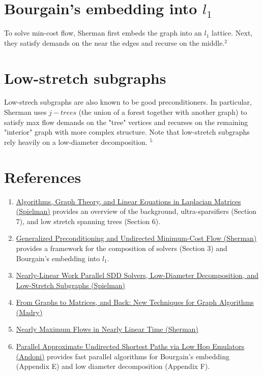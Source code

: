 \documentclass[11pt]{article}
\begin{document}
\section{Bourgain's embedding into $l_1$} To solve min-cost flow, Sherman first embeds the graph into an $l_1$ lattice. Next, they satisfy demands on the near the edges and recurse on the middle.$^2$

\section{Low-stretch subgraphs} Low-strech subgraphs are also known to be good preconditioners. In particular, Sherman uses $j-trees$ (the union of a forest together with another graph) to satisfy max flow demands on the "tree" vertices and recurses on the remaining "interior" graph with more complex structure. Note that low-stretch subgraphs rely heavily on a low-diameter decomposition. $^5$

\section{References}
\begin{enumerate}
        \item{} \href{http://www.cs.yale.edu/homes/spielman/PAPERS/icm10post.pdf}{Algorithms, Graph Theory, and Linear Equations in Laplacian Matrices (Spielman)} provides an overview of the background, ultra-sparsifiers (Section 7), and low stretch spanning trees (Section 6).

        \item{} \href{https://epubs.siam.org/doi/pdf/10.1137/1.9781611974782.49}{Generalized Preconditioning and Undirected Minimum-Cost Flow (Sherman)} provides a framework for the composition of solvers (Section 3) and Bourgain's embedding into $l_1$.

        \item{} \href{https://www.cs.cmu.edu/~guyb/papers/BGKMPT14.pdf}{Nearly-Linear Work Parallel SDD Solvers, Low-Diameter Decomposition, and Low-Stretch Subgraphs (Spielman)}

        \item{} \href{https://people.csail.mit.edu/madry/docs/thesis.pdf}{From Graphs to Matrices, and Back: New Techniques for Graph Algorithms (Madry)}

        \item{} \href{https://arxiv.org/pdf/1304.2077.pdf}{Nearly Maximum Flows in Nearly Linear Time (Sherman)}

        \item{} \href{https://arxiv.org/abs/1911.01956}{Parallel Approximate Undirected Shortest Paths via Low Hop Emulators (Andoni)} provides fast parallel algorithms for Bourgain's embedding (Appendix E) and low diameter decomposition (Appendix F).
\end{enumerate}
\end{document}
